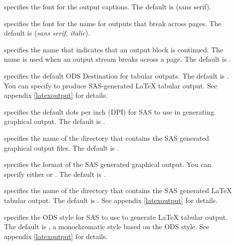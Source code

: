 \documentclass[article,oneside]{memoir}
\begin{document}
    \begin{description}
     \item[] specifies the font for the output captions.
     The default is  (\textsf{sans serif}).

     \item[] specifies the font for the  name
     for outputs that break across pages.
     The default is  (\textsf{\textit{sans serif, italic}}).

     \item[] specifies the name that indicates that an output
     block is continued. The name is used when an output stream breaks across a page.
     The default is .

    \item[] specifies the default ODS Destination for tabular
    outputs. The default is . You can specify  to produce
    SAS-generated LaTeX tabular output. See appendix \ref{latexoutput} for details.

    \item[] specifies the default dots per inch (DPI) for SAS to use in generating
    graphical output. The default is .

    \item[] specifies the name of the directory that contains the SAS
     generated graphical output files. The default is .

    \item[] specifies the format of the SAS
     generated graphical output. You can specify either
      or . The default is .

    \item[] specifies the name of the directory that contains the
    SAS generated LaTeX tabular output. The default is .
    See appendix \ref{latexoutput} for details.

    \item[] specifies the ODS style for SAS to use to generate
    LaTeX tabular output. The default is , a monochromatic style based
    on the  ODS style.
    See appendix \ref{latexoutput} for details.


\end{description}
\end{document}
